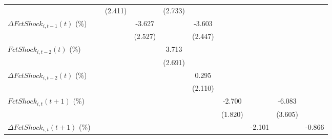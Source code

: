 {\begin{tabular}{l*{9}{c}}
                    &                     &     (2.411)         &                     &     (2.733)         &                     &                     &                     &                     &                     \\
\addlinespace
$ \Delta FctShock_{i,t-1}(t)$ (\%)&                     &                     &      -3.627         &                     &      -3.603         &                     &                     &                     &                     \\
                    &                     &                     &     (2.527)         &                     &     (2.447)         &                     &                     &                     &                     \\
\addlinespace
$ FctShock_{i,t-2}(t)$ (\%)&                     &                     &                     &       3.713         &                     &                     &                     &                     &                     \\
                    &                     &                     &                     &     (2.691)         &                     &                     &                     &                     &                     \\
\addlinespace
$ \Delta FctShock_{i,t-2}(t)$ (\%)&                     &                     &                     &                     &       0.295         &                     &                     &                     &                     \\
                    &                     &                     &                     &                     &     (2.110)         &                     &                     &                     &                     \\
\addlinespace
$ FctShock_{i,t}(t+1)$ (\%)&                     &                     &                     &                     &                     &      -2.700         &                     &      -6.083         &                     \\
                    &                     &                     &                     &                     &                     &     (1.820)         &                     &     (3.605)         &                     \\
\addlinespace
$ \Delta FctShock_{i,t}(t+1)$ (\%)&                     &                     &                     &                     &                     &                     &      -2.101\sym{*}  &                     &      -0.866         \\

\end{tabular}}
